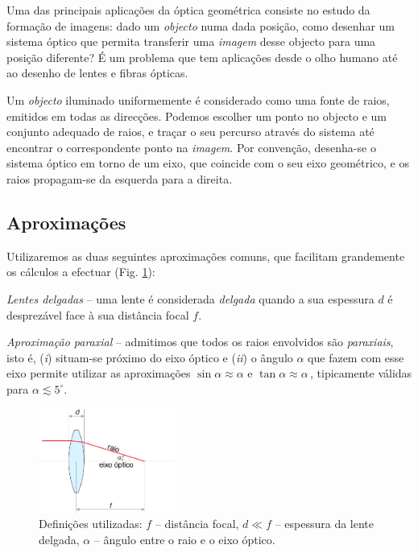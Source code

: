 \documentclass[a4paper,twoside,11pt]{report}      %
\begin{document}
Uma das principais aplicações da óptica geométrica consiste no estudo da formação de imagens: dado um \emph{objecto} numa dada posição, como desenhar um sistema óptico que permita transferir uma \emph{imagem} desse objecto para uma posição diferente? É um problema que tem aplicações desde o olho humano até ao desenho de lentes e fibras ópticas.

 Um \emph{objecto} iluminado uniformemente é considerado como uma fonte de raios, emitidos em todas as direcções. Podemos escolher um ponto no objecto e um conjunto adequado de raios, e traçar o seu percurso através do sistema até encontrar o correspondente ponto na \emph{imagem}. Por convenção, desenha-se o sistema óptico em torno de um eixo, que coincide com o seu eixo geométrico, e os raios propagam-se da esquerda para a direita. 



\subsection{\sf Aproximações}
Utilizaremos as duas seguintes aproximações comuns, que facilitam grandemente os cálculos a efectuar (Fig. \ref{fig:fig2}):

\emph{Lentes delgadas} -- uma lente é considerada \emph{delgada} quando a sua espessura $d$ é desprezável face à sua distância focal $f$.

\emph{Aproximação paraxial} -- admitimos que todos os raios envolvidos são \emph{paraxiais}, isto é, (\emph{i}) situam-se próximo do eixo óptico e (\emph{ii}) o ângulo $\alpha$ que fazem com esse eixo permite utilizar as aproximações $\sin \alpha \approx \alpha$ e  $\tan \alpha \approx \alpha\,$, tipicamente válidas para $\alpha \lesssim 5^{\circ}$.

\begin{figure}
	[!ht]  \centering 
	\includegraphics[width=0.4\textwidth]{2-definicoes}
 	\caption{\label{fig:fig2} Definições utilizadas: $f$ -- distância focal, $d\ll f$ -- espessura da lente delgada, $\alpha$ -- ângulo entre o raio e o eixo óptico.} 
\end{figure}
\end{document}
